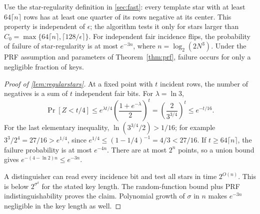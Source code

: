 \begin{lemma}\label{lem:regularstars}
Use the star-regularity definition in \cref{sec:fast}: every template star with at least $64\lceil n\rceil$ rows has at least one quarter of its rows negative at its center. This property is independent of $\epsilon$; the algorithm tests it only for stars larger than $C_0=\max\{64\lceil n\rceil,\lceil128/\epsilon\rceil\}$. For independent fair incidence flips, the probability of failure of star-regularity is at most $e^{-3n}$, where $n=\log_2(2N^3)$. Under the PRF assumption and parameters of Theorem~\ref{thm:prf}, failure occurs for only a negligible fraction of keys.
\end{lemma}

\begin{proof}[Proof of \cref{lem:regularstars}]
At a fixed point with $t$ incident rows, the number of negatives is a sum of $t$ independent fair bits. For $\lambda=\ln3$,
\[
 \Pr[Z<t/4]\le e^{\lambda t/4}\left(\frac{1+e^{-\lambda}}2\right)^t
 =\left(\frac{2}{3^{3/4}}\right)^t\le e^{-t/16}.
\]
For the last elementary inequality, $\ln(3^{3/4}/2)>1/16$; for example $3^3/2^4=27/16>e^{1/4}$, since $e^{1/4}\le(1-1/4)^{-1}=4/3<27/16$. If $t\ge64\lceil n\rceil$, the failure probability is at most $e^{-4n}$. There are at most $2^n$ points, so a union bound gives $e^{-(4-\ln2)n}\le e^{-3n}$.

A distinguisher can read every incidence bit and test all stars in time $2^{O(n)}$. This is below $2^{\sigma^\delta}$ for the stated key length. The random-function bound plus PRF indistinguishability proves the claim. Polynomial growth of $\sigma$ in $n$ makes $e^{-3n}$ negligible in the key length as well.
\end{proof}
